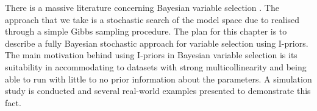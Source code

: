 \documentclass[a4paper,showframe,11pt]{report}
\begin{document}
There is a massive literature concerning Bayesian variable selection \citep{Chipman2001,OHara2009}.
The approach that we take is a stochastic search of the model space due to \citet{George1993,Kuo1998} realised through a simple Gibbs sampling procedure.
The plan for this chapter is to describe a fully Bayesian stochastic approach for variable selection using I-priors. 
The main motivation behind using I-priors in Bayesian variable selection is its suitability in accommodating to datasets with strong multicollinearity and being able to run with little to no prior information about the parameters.
A simulation study is conducted and several real-world examples presented to demonstrate this fact. 



\end{document}
